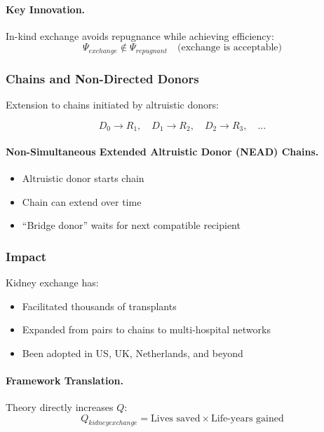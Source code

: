 \paragraph{Key Innovation.}
In-kind exchange avoids repugnance while achieving efficiency:
\begin{equation}
\Psi_{exchange} \not\in \Psi_{repugnant} \quad \text{(exchange is acceptable)}
\end{equation}

\subsubsection{Chains and Non-Directed Donors}

Extension to chains initiated by altruistic donors:

\begin{equation}
D_0 \to R_1, \quad D_1 \to R_2, \quad D_2 \to R_3, \quad \ldots
\end{equation}

\paragraph{Non-Simultaneous Extended Altruistic Donor (NEAD) Chains.}
\begin{itemize}
    \item Altruistic donor starts chain
    \item Chain can extend over time
    \item ``Bridge donor'' waits for next compatible recipient
\end{itemize}

\subsubsection{Impact}

Kidney exchange has:
\begin{itemize}
    \item Facilitated thousands of transplants
    \item Expanded from pairs to chains to multi-hospital networks
    \item Been adopted in US, UK, Netherlands, and beyond
\end{itemize}

\paragraph{Framework Translation.}
Theory directly increases $Q$:
\begin{equation}
Q_{kidney exchange} = \text{Lives saved} \times \text{Life-years gained}
\end{equation}

